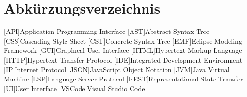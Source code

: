 \chapter*{Abkürzungsverzeichnis}


\begin{acronym}[XXXXXX]
    [API]{Application Programming Interface}
    [AST]{Abstract Syntax Tree}
    [CSS]{Cascading Style Sheet}
    [CST]{Concrete Syntax Tree}
    [EMF]{Eclipse Modeling Framework}
    [GUI]{Graphical User Interface}
    [HTML]{Hypertext Markup Language}
    [HTTP]{Hypertext Transfer Protocol}
    [IDE]{Integrated Development Environment}
    [IP]{Internet Protocol}
    [JSON]{JavaScript Object Notation}
    [JVM]{Java Virtual Machine}
    [LSP]{Language Server Protocol}
    [REST]{Representational State Transfer}
    [UI]{User Interface}
    [VSCode]{Visual Studio Code}
\end{acronym}
